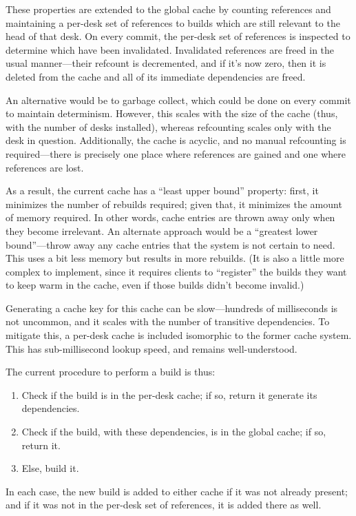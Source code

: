\documentclass[twoside]{article}
\begin{document}
These properties are extended to the global cache by counting references and maintaining a per-desk set of references to builds which are still relevant to the head of that desk.  On every commit, the per-desk set of references is inspected to determine which have been invalidated.  Invalidated references are freed in the usual manner—their refcount is decremented, and if it's now zero, then it is deleted from the cache and all of its immediate dependencies are freed.

An alternative would be to garbage collect, which could be done on every commit to maintain determinism.  However, this scales with the size of the cache (thus, with the number of desks installed), whereas refcounting scales only with the desk in question.  Additionally, the cache is acyclic, and no manual refcounting is required—there is precisely one place where references are gained and one where references are lost.

As a result, the current cache has a “least upper bound” property:  first, it minimizes the number of rebuilds required; given that, it minimizes the amount of memory required.  In other words, cache entries are thrown away only when they become irrelevant.  An alternate approach would be a “greatest lower bound”—throw away any cache entries that the system is not certain to need.  This uses a bit less memory but results in more rebuilds.  (It is also a little more complex to implement, since it requires clients to “register” the builds they want to keep warm in the cache, even if those builds didn't become invalid.)

Generating a cache key for this cache can be slow—hundreds of milliseconds is not uncommon, and it scales with the number of transitive dependencies.  To mitigate this, a per-desk cache is included isomorphic to the former cache system.  This has sub-millisecond lookup speed, and remains well-understood.

The current procedure to perform a build is thus:

\begin{enumerate}
  \item  Check if the build is in the per-desk cache; if so, return it
generate its dependencies.
  \item  Check if the build, with these dependencies, is in the global cache; if so, return it.
  \item  Else, build it.
\end{enumerate}
\noindent
In each case, the new build is added to either cache if it was not already present; and if it was not in the per-desk set of references, it is added there as well.
\end{document}
